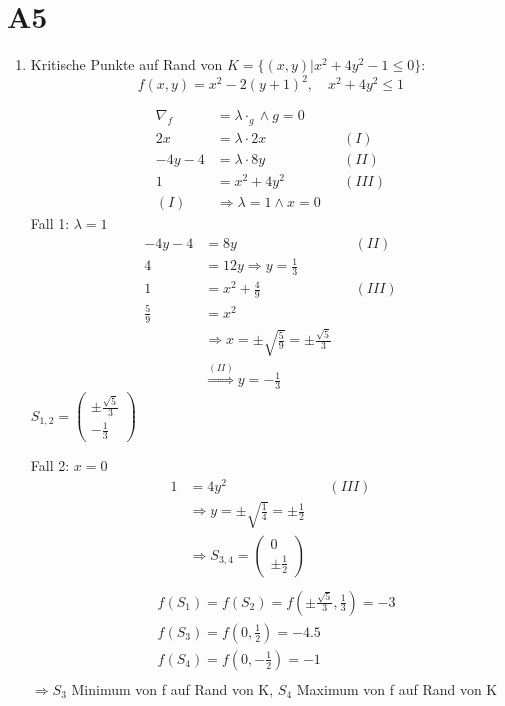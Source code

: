 \documentclass[fleqn,12pt]{scrartcl}
\begin{document}
	\section*{A5}
	\begin{enumerate}
		\item
			Kritische Punkte auf Rand von $K = \{(x,y) | x^2 + 4y^2 - 1 \leq 0\} $:
			\begin{equation*}
				f(x,y) = x^2 -2(y+1)^2, \quad x^2 + 4y^2 \leq 1
			\end{equation*}

			\begin{align*}
				\nabla_f &= \lambda \cdot_g \wedge g = 0\\
				2x &= \lambda \cdot 2x && (I)\\
				-4y-4 &= \lambda \cdot 8y && (II) \\
				1 &= x^2 + 4y^2 && (III) \\
				(I) &\Rightarrow \lambda = 1 \wedge x = 0
			\end{align*}
			Fall 1: $\lambda = 1$
			\begin{align*}
				-4y - 4 &= 8y && (II) \\
				4 &= 12y \Rightarrow y = \frac13&& \\
				1 &= x^2 + \frac49 && (III)\\
				\frac59 &= x^2 \\
											&\Rightarrow x = \pm\sqrt{\frac59} = \pm\frac{\sqrt{5}}3\\
										 &\overset{(II)}\Rightarrow y = -\frac13
			\end{align*}
		$S_{1,2} = \begin{pmatrix}\pm\frac{\sqrt{5}}3\\ -\frac13\end{pmatrix}$

			Fall 2: $x = 0$
			\begin{align*}
				1 &= 4y^2 && (III)\\
					&\Rightarrow y = \pm \sqrt{\frac14} = \pm {\frac12}\\
				 &\Rightarrow S_{3,4} = \begin{pmatrix} 0\\ \pm{\frac12}\end{pmatrix}\\
			\end{align*}
			\begin{align*}
				&f(S_1) = f(S_2) = f(\pm\frac{\sqrt{5}}3, \frac13) = -3\\
				&f(S_3) = f(0, {\frac12}) =  -4.5\\
				&f(S_4) = f(0, -{\frac12}) = -1\\
			\end{align*}
			$\Rightarrow S_3$ Minimum von f auf Rand von K, $S_4$ Maximum von f auf Rand von K


\end{enumerate}
\end{document}
